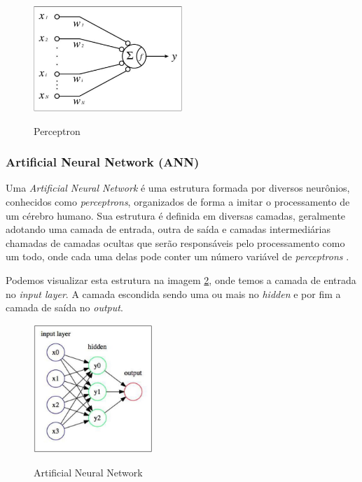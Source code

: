 \begin{figure}[!htb]
	\centering
	\caption{Perceptron}
	\includegraphics[width=0.50\textwidth]{img/perceptron.jpg}
	\label{fig:perceptron}
\end{figure}

\subsubsection{Artificial Neural Network (ANN)}
Uma \emph{Artificial Neural Network} é uma estrutura formada por diversos neurônios, conhecidos como \emph{perceptrons}, organizados de forma a imitar o processamento de um cérebro humano. Sua estrutura é definida em diversas camadas, geralmente adotando uma camada de entrada, outra de saída e camadas intermediárias chamadas de camadas ocultas que serão responsáveis pelo processamento como um todo, onde cada uma delas pode conter um número variável de \emph{perceptrons} \cite{deepLearningTensorFlow}.

Podemos visualizar esta estrutura na imagem \ref{fig:neuralNetwork}, onde temos a camada de entrada no \emph{input layer}. A camada escondida sendo uma ou mais no \emph{hidden} e por fim a camada de saída no \emph{output}.

\begin{figure}[!htb]
	\centering
	\caption{Artificial Neural Network}
	\includegraphics[width=0.40\textwidth]{img/neuralNetwork.jpg}
	\label{fig:neuralNetwork}
\end{figure}

